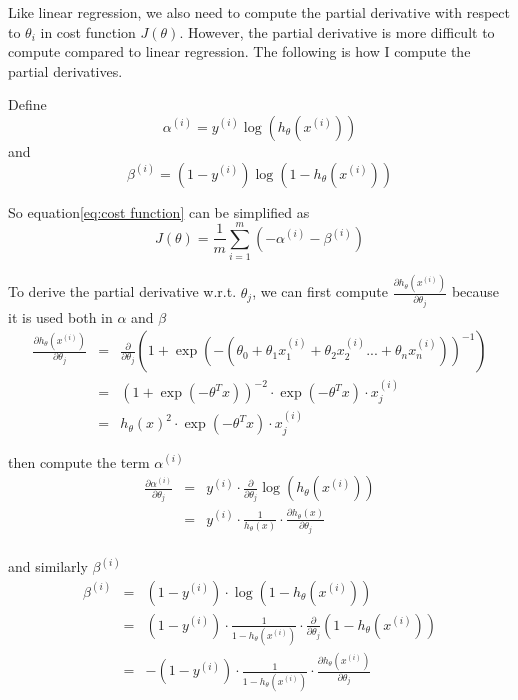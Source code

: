 \documentclass{article} %
\begin{document}

Like linear regression, we also need to compute the partial derivative with respect to $\theta_i$ in cost function $J(\theta)$.
However, the partial derivative is more difficult to compute compared to linear regression. The following is how I compute the partial derivatives.

Define
$$ \alpha^{(i)}=y^{(i)}\log (h_\theta(x^{(i)})) $$
and
$$ \beta^{(i)}=(1-y^{(i)})\log (1-h_\theta(x^{(i)})) $$

So equation\ref{eq:cost function} can be simplified as $$J(\theta)=\frac{1}{m} \sum_{i=1}^{m} (- \alpha^{(i)} - \beta^{(i)})$$

To derive the partial derivative w.r.t. $\theta_j$, we can first compute $\frac{\partial h_\theta(x^{(i)})}{\partial \theta_j}$ because it is used both in $\alpha$ and $\beta$
\begin{eqnarray*}
    \frac{\partial h_\theta(x^{(i)})}{\partial \theta_j} &=& \frac{\partial}{\partial \theta_j} (1+\exp(-(\theta_0+\theta_1 x^{(i)}_1+\theta_2 x^{(i)}_2...+\theta_n x^{(i)}_n))^{-1})\\
    &=& (1 + \exp(-\theta^T x))^{-2} \cdot \exp(-\theta^T x) \cdot x^{(i)}_j\\
    &=& h_\theta(x)^2 \cdot \exp(-\theta^T x) \cdot x^{(i)}_j
\end{eqnarray*}

then compute the term $\alpha^{(i)}$
\begin{eqnarray*}
    \frac{\partial \alpha^{(i)}}{\partial \theta_j} &=& y^{(i)} \cdot \frac{\partial}{\partial \theta_j} \log (h_\theta(x^{(i)}))\\
    &=& y^{(i)} \cdot \frac{1}{h_{\theta}(x)} \cdot \frac{\partial h_\theta(x)}{\partial \theta_j}\\
\end{eqnarray*}

and similarly $\beta^{(i)}$
\begin{eqnarray*}
    \beta^{(i)} &=& (1-y^{(i)}) \cdot \log (1-h_\theta(x^{(i)}))\\
    &=& (1-y^{(i)}) \cdot \frac{1}{1-h_\theta(x^{(i)})} \cdot \frac{\partial}{\partial \theta_j} (1-h_\theta(x^{(i)}))\\
    &=& -(1-y^{(i)}) \cdot \frac{1}{1-h_\theta(x^{(i)})} \cdot \frac{\partial h_\theta(x^{(i)})}{\partial \theta_j}
\end{eqnarray*}
\end{document}
